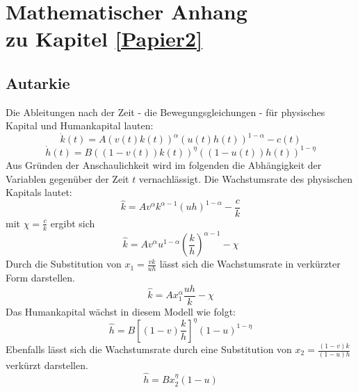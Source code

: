 \chapter[Mathematischer Anhang zu Kapitel \ref{Papier2}]{Mathematischer Anhang\\zu Kapitel \ref{Papier2}}
\section{Autarkie}\label{AutarkieAPPENDIX}

Die Ableitungen nach der Zeit - die Bewegungsgleichungen - für physisches Kapital und Humankapital lauten:
\begin{equation}
\dot{k}(t)=A(v(t)k(t))^\alpha(u(t)h(t))^{1-\alpha}-c(t)
\end{equation}
\vspace{-0.7cm}
\begin{equation}
\dot{h}(t)=B((1-v(t))k(t))^{\eta}((1-u(t))h(t))^{1-\eta}
\end{equation}
Aus Gründen der Anschaulichkeit wird im folgenden die Abhängigkeit der Variablen gegenüber der Zeit $t$ vernachlässigt. Die Wachstumsrate des physischen Kapitals lautet: 
\begin{equation*}
\hat{k}=Av^\alpha k^{\alpha-1}(uh)^{1-\alpha}-\frac{c}{k}
\end{equation*}
mit $\chi=\frac{c}{k}$ ergibt sich
\begin{equation}
\hat{k}=Av^\alpha u^{1-\alpha}\left(\frac{k}{h}\right)^{\alpha-1}-\chi
\end{equation}
Durch die Substitution von $x_1=\frac{vk}{uh}$ lässt sich die Wachstumsrate in verkürzter Form darstellen. 
\begin{equation}
\boxed{\hat{k}=Ax_1^\alpha \frac{uh}{k}-\chi}
\end{equation}
Das Humankapital wächst in diesem Modell wie folgt: 
\begin{equation}
\hat{h}=B\left[(1-v)\frac{k}{h}\right]^{\eta}(1-u)^{1-\eta}
\end{equation}
Ebenfalls lässt sich die Wachstumsrate durch eine Substitution von $x_2=\frac{(1-v)k}{(1-u)h}$ verkürzt darstellen. 
\begin{equation}
\boxed{\hat{h}=Bx_2^\eta(1-u)}
\end{equation}


